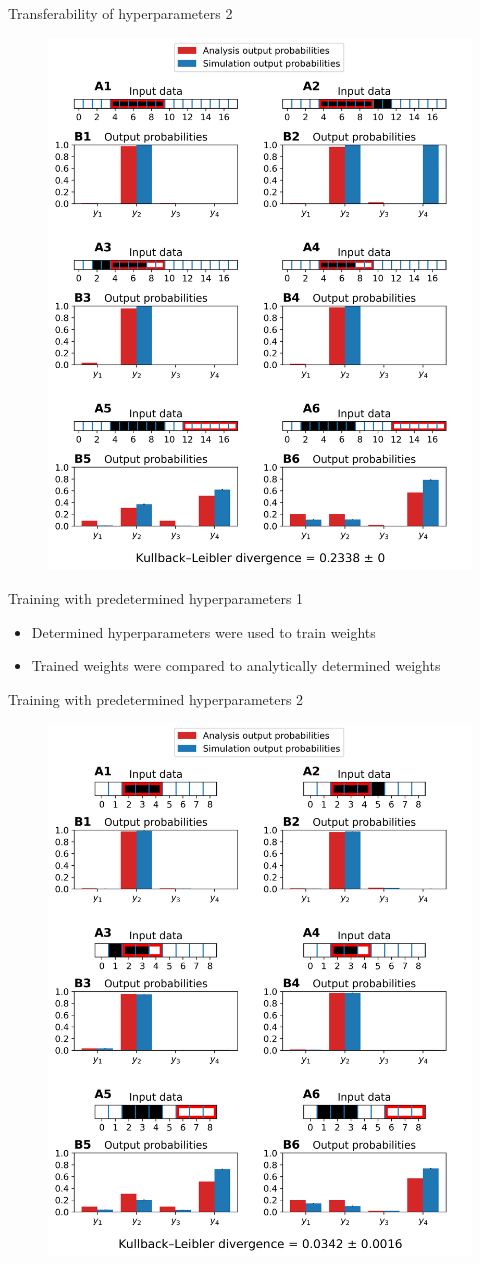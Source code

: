 \documentclass[aspectratio=169]{beamer}
\begin{document}
\begin{frame}{Transferability of hyperparameters 2}
 \vspace{-1.0cm}
		\begin{figure}
        \includegraphics[width=0.4\linewidth]{../Latex/figures/1D/doubleSize/doubleSize_98_880_4.png}
      \end{figure} 
\end{frame}



\begin{frame}{Training with predetermined hyperparameters 1}
  \begin{itemize}
    \item Determined hyperparameters were used to train weights
    \item Trained weights were compared to analytically determined weights
  \end{itemize}
\end{frame}

\begin{frame}{Training with predetermined hyperparameters 2}
 \vspace{-1.0cm}
		\begin{figure}
        \includegraphics[width=0.35\linewidth]{../Latex/figures/1D/training/trainingEvaluation_98_440_4_c3.png}
      \end{figure} 
\end{frame}
\end{document}
